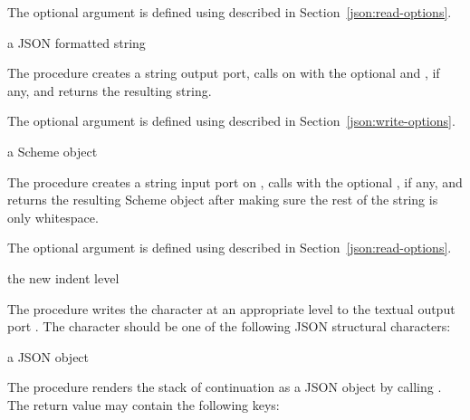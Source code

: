 The optional  argument is defined using
 described in Section~\ref{json:read-options}.

\begin{procedure}
\end{procedure}
\returns{} a JSON formatted string

The  procedure creates a string output port,
calls  on  with the optional  and
, if any, and returns the resulting string.

The optional  argument is defined using
 described in
Section~\ref{json:write-options}.

\begin{procedure}
\end{procedure}
\returns{} a Scheme object

The  procedure creates a string input port
on , calls  with the optional ,
if any, and returns the resulting Scheme object after making sure the rest
of the string is only whitespace.

The optional  argument is defined using
 described in Section~\ref{json:read-options}.

\begin{procedure}
\end{procedure}
\returns{} the new indent level

The  procedure writes the character
 at an appropriate  level to the textual output
port . The character should be one of the following JSON
structural characters: \code{[ ] \{ \} : ,}

\begin{procedure}
\end{procedure}
\returns{} a JSON object

The  procedure renders the stack of continuation 
as a JSON object by calling \hyperlink{walk-stack}{}.
The return value may contain the following keys:

